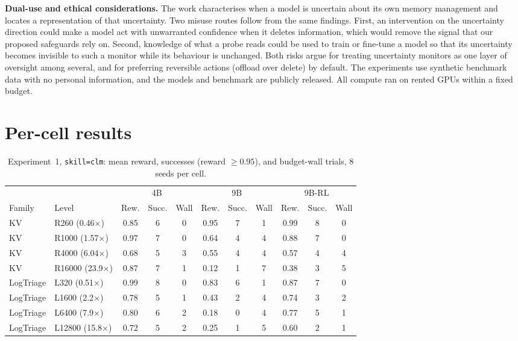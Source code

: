 \documentclass{article}
\begin{document}
\textbf{Dual-use and ethical considerations.} The work characterises when a model is uncertain about its own memory management and locates a representation of that uncertainty.
Two misuse routes follow from the same findings.
First, an intervention on the uncertainty direction could make a model act with unwarranted confidence when it deletes information, which would remove the signal that our proposed safeguards rely on.
Second, knowledge of what a probe reads could be used to train or fine-tune a model so that its uncertainty becomes invisible to such a monitor while its behaviour is unchanged.
Both risks argue for treating uncertainty monitors as one layer of oversight among several, and for preferring reversible actions (offload over delete) by default.
The experiments use synthetic benchmark data with no personal information, and the models and benchmark are publicly released.
All compute ran on rented GPUs within a fixed budget.

\section{Per-cell results}
\label{app:tables}

\begin{table}[!ht]
  \centering
  \small
  \caption{Experiment~1, \texttt{skill=clm}: mean reward, successes (reward $\geq 0.95$), and budget-wall trials, 8 seeds per cell.}
  \begin{tabular}{@{}llccc|ccc|ccc@{}}
    \toprule
    & & \multicolumn{3}{c}{4B} & \multicolumn{3}{c}{9B} & \multicolumn{3}{c}{9B-RL} \\
    Family & Level & Rew. & Succ. & Wall & Rew. & Succ. & Wall & Rew. & Succ. & Wall \\
    \midrule
    KV & R260 (0.46$\times$) & 0.85 & 6 & 0 & 0.95 & 7 & 1 & 0.99 & 8 & 0 \\
    KV & R1000 (1.57$\times$) & 0.97 & 7 & 0 & 0.64 & 4 & 4 & 0.88 & 7 & 0 \\
    KV & R4000 (6.04$\times$) & 0.68 & 5 & 3 & 0.55 & 4 & 4 & 0.57 & 4 & 4 \\
    KV & R16000 (23.9$\times$) & 0.87 & 7 & 1 & 0.12 & 1 & 7 & 0.38 & 3 & 5 \\
    LogTriage & L320 (0.51$\times$) & 0.99 & 8 & 0 & 0.83 & 6 & 1 & 0.87 & 7 & 0 \\
    LogTriage & L1600 (2.2$\times$) & 0.78 & 5 & 1 & 0.43 & 2 & 4 & 0.74 & 3 & 2 \\
    LogTriage & L6400 (7.9$\times$) & 0.80 & 6 & 2 & 0.18 & 0 & 4 & 0.77 & 5 & 1 \\
    LogTriage & L12800 (15.8$\times$) & 0.72 & 5 & 2 & 0.25 & 1 & 5 & 0.60 & 2 & 1 \\
    \bottomrule
  \end{tabular}
\end{table}
\end{document}
